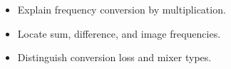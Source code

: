 \begin{objectives}
\begin{itemize}[leftmargin=1.4em,itemsep=2pt]
\item Explain frequency conversion by multiplication.
\item Locate sum, difference, and image frequencies.
\item Distinguish conversion loss and mixer types.
\end{itemize}
\end{objectives}
